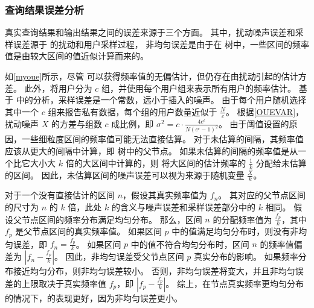 \subsubsection{查询结果误差分析}
真实查询结果和\myahead 输出结果之间的误差来源于三个方面。
其中，扰动噪声误差和采样误差源于 \oue 的扰动和用户采样过程，
非均匀误差是由于在 \myahead 树中，一些区间的频率值是由较大区间的值近似计算而来的。

如\autoref{myoue}所示，尽管 \oue 可以获得频率值的无偏估计，但仍存在由扰动引起的估计方差。
此外，\myahead 将用户分为 $c$ 组，并使用每个用户组来表示所有用户的频率估计。 
基于 \cite{yang2020answering} 中的分析，采样误差是一个常数，远小于插入的噪声。
由于每个用户随机选择其中一个 $c$ 组来报告私有数据，每个组的用户数量近似于 $\frac{N}{c}$。
根据\autoref{OUEVAR}，扰动噪声 $X$ 的方差与组数 $c$ 成比例，即 $\sigma^2 = c \cdot \frac{4e^{\epsilon}}{N\left(e^{\epsilon}-1\right)^{2}}$。
由于阈值设置的原因，一些细粒度区间的频率值可能无法直接估算。
对于未估算的间隔，其频率值应该从更大的间隔中计算，即 \myahead 树中的父节点。
如果未估算的间隔的频率值是从一个比它大小大 $k$ 倍的大区间中计算的，则 \myahead 将大区间的估计频率的 $\frac{1}{k}$ 分配给未估算的区间。
因此，未估算区间的噪声误差可以视为来源于随机变量 $\frac{X}{k}$。

对于一个没有直接估计的区间 $n$，假设其真实频率值为 $f_n$。
其对应的父节点区间的尺寸为 $n$ 的 $k$ 倍，此处 $k$ 的含义与噪声误差和采样误差部分中的 $k$ 相同。
假设父节点区间的频率分布满足均匀分布\cite{qardaji2013differentially}。
那么，区间 $n$ 的分配频率值为 $\frac{f_p}{k}$，其中 $f_p$ 是父节点区间的真实频率值。
如果区间 $p$ 中的值满足均匀分布时，则没有非均匀误差，即 $f_n = \frac{f_p}{k}$。
如果区间 $p$ 中的值不符合均匀分布时，区间 $n$ 的频率值偏差为 $|f_n - \frac{f_p}{k}|$。
因此，非均匀误差受父节点区间 $p$ 真实分布的影响。
如果频率分布接近均匀分布，则非均匀误差较小。
否则，非均匀误差将变大，并且非均匀误差的上限取决于真实频率值 $f_p$，即 $|f_p - \frac{f_p}{k}|$。
综上，在节点真实频率更均匀分布的情况下，\myahead 的表现更好，因为非均匀误差更小。

